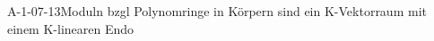 
\begin{EXA}{A-1-07-13}{Moduln bzgl Polynomringe in Körpern sind ein K-Vektorraum mit einem K-linearen Endo}
\end{EXA}
